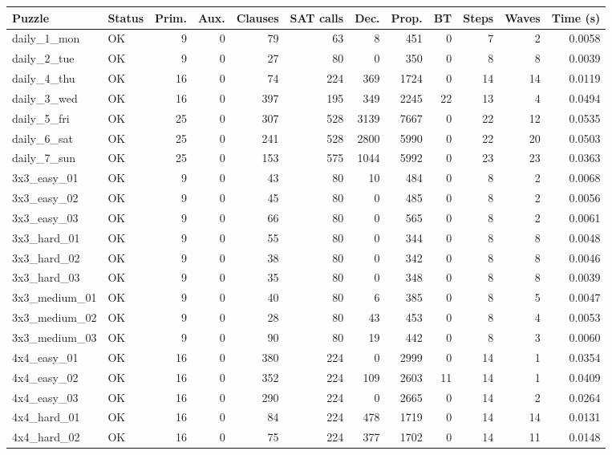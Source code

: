 \begin{tabular}{l l r r r r r r r r r r }
\hline
Puzzle & Status & Prim. & Aux. & Clauses & SAT calls & Dec. & Prop. & BT & Steps & Waves & Time (s) \\
\hline
daily\_1\_mon & OK & 9 & 0 & 79 & 63 & 8 & 451 & 0 & 7 & 2 & 0.0058 \\
daily\_2\_tue & OK & 9 & 0 & 27 & 80 & 0 & 350 & 0 & 8 & 8 & 0.0039 \\
daily\_4\_thu & OK & 16 & 0 & 74 & 224 & 369 & 1724 & 0 & 14 & 14 & 0.0119 \\
daily\_3\_wed & OK & 16 & 0 & 397 & 195 & 349 & 2245 & 22 & 13 & 4 & 0.0494 \\
daily\_5\_fri & OK & 25 & 0 & 307 & 528 & 3139 & 7667 & 0 & 22 & 12 & 0.0535 \\
daily\_6\_sat & OK & 25 & 0 & 241 & 528 & 2800 & 5990 & 0 & 22 & 20 & 0.0503 \\
daily\_7\_sun & OK & 25 & 0 & 153 & 575 & 1044 & 5992 & 0 & 23 & 23 & 0.0363 \\
3x3\_easy\_01 & OK & 9 & 0 & 43 & 80 & 10 & 484 & 0 & 8 & 2 & 0.0068 \\
3x3\_easy\_02 & OK & 9 & 0 & 45 & 80 & 0 & 485 & 0 & 8 & 2 & 0.0056 \\
3x3\_easy\_03 & OK & 9 & 0 & 66 & 80 & 0 & 565 & 0 & 8 & 2 & 0.0061 \\
3x3\_hard\_01 & OK & 9 & 0 & 55 & 80 & 0 & 344 & 0 & 8 & 8 & 0.0048 \\
3x3\_hard\_02 & OK & 9 & 0 & 38 & 80 & 0 & 342 & 0 & 8 & 8 & 0.0046 \\
3x3\_hard\_03 & OK & 9 & 0 & 35 & 80 & 0 & 348 & 0 & 8 & 8 & 0.0039 \\
3x3\_medium\_01 & OK & 9 & 0 & 40 & 80 & 6 & 385 & 0 & 8 & 5 & 0.0047 \\
3x3\_medium\_02 & OK & 9 & 0 & 28 & 80 & 43 & 453 & 0 & 8 & 4 & 0.0053 \\
3x3\_medium\_03 & OK & 9 & 0 & 90 & 80 & 19 & 442 & 0 & 8 & 3 & 0.0060 \\
4x4\_easy\_01 & OK & 16 & 0 & 380 & 224 & 0 & 2999 & 0 & 14 & 1 & 0.0354 \\
4x4\_easy\_02 & OK & 16 & 0 & 352 & 224 & 109 & 2603 & 11 & 14 & 1 & 0.0409 \\
4x4\_easy\_03 & OK & 16 & 0 & 290 & 224 & 0 & 2665 & 0 & 14 & 2 & 0.0264 \\
4x4\_hard\_01 & OK & 16 & 0 & 84 & 224 & 478 & 1719 & 0 & 14 & 14 & 0.0131 \\
4x4\_hard\_02 & OK & 16 & 0 & 75 & 224 & 377 & 1702 & 0 & 14 & 11 & 0.0148 \\

\end{tabular}
